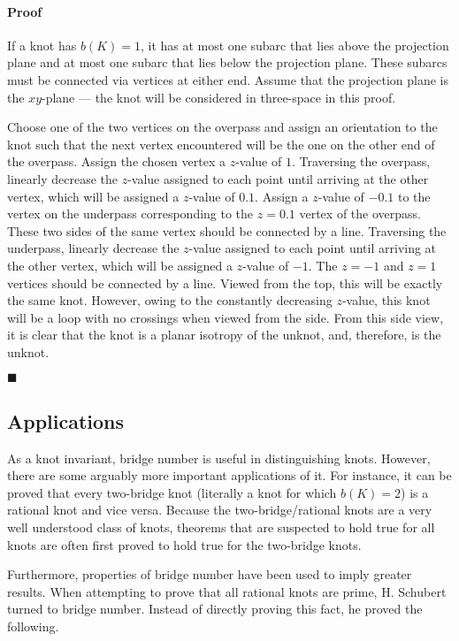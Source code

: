 \documentclass[titlepage,11pt]{article}
\newcommand{\qed}{
    \begin{flushright}
        $\blacksquare$
    \end{flushright}
}
\begin{document}
\paragraph{Proof} If a knot has $b(K)=1$, it has at most one subarc that lies above the projection plane and at most one subarc that lies below the projection plane. These subarcs must be connected via vertices at either end. Assume that the projection plane is the $xy$-plane --- the knot will be considered in three-space in this proof.\par
Choose one of the two vertices on the overpass and assign an orientation to the knot such that the next vertex encountered will be the one on the other end of the overpass. Assign the chosen vertex a $z$-value of $1$. Traversing the overpass, linearly decrease the $z$-value assigned to each point until arriving at the other vertex, which will be assigned a $z$-value of $0.1$. Assign a $z$-value of $-0.1$ to the vertex on the underpass corresponding to the $z=0.1$ vertex of the overpass. These two sides of the same vertex should be connected by a line. Traversing the underpass, linearly decrease the $z$-value assigned to each point until arriving at the other vertex, which will be assigned a $z$-value of $-1$. The $z=-1$ and $z=1$ vertices should be connected by a line. Viewed from the top, this will be exactly the same knot. However, owing to the constantly decreasing $z$-value, this knot will be a loop with no crossings when viewed from the side. From this side view, it is clear that the knot is a planar isotropy of the unknot, and, therefore, is the unknot.
\qed


\subsection{Applications}\label{sss:applications}
As a knot invariant, bridge number is useful in distinguishing knots. However, there are some arguably more important applications of it. For instance, it can be proved that every two-bridge knot (literally a knot for which $b(K)=2$) is a rational knot and vice versa. Because the two-bridge/rational knots are a very well understood class of knots, theorems that are suspected to hold true for all knots are often first proved to hold true for the two-bridge knots.\par
Furthermore, properties of bridge number have been used to imply greater results. When attempting to prove that all rational knots are prime, H. Schubert turned to bridge number. Instead of directly proving this fact, he proved the following.
\end{document}
